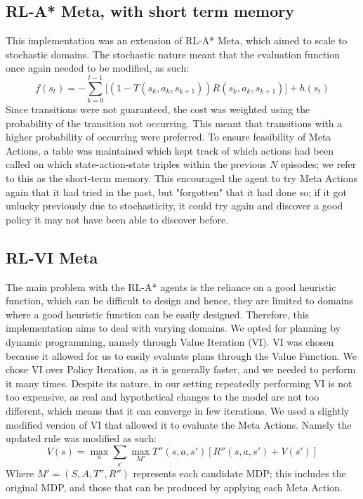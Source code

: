 \subsection{RL-A* Meta, with short term memory}
\label{sec:342}
This implementation was an extension of RL-A* Meta, which aimed to scale to stochastic domains. The stochastic nature meant that the evaluation function once again needed to be modified, as such:
\begin{equation}
\label{eqn:astarevalsast}
f(s_t) = -\sum_{k=0}^{t-1}\Bigg[(1-T(s_k, a_k, s_{k+1}))R(s_k, a_k, s_{k+1})\Bigg] + h(s_t)
\end{equation}
Since transitions were not guaranteed, the cost was weighted using the probability of the transition not occurring. This meant that transitions with a higher probability of occurring were preferred.
To ensure feasibility of Meta Actions, a table was maintained which kept track of which actions had been called on which state-action-state triples within the previous $N$ episodes; we refer to this as the short-term memory. This encouraged the agent to try Meta Actions again that it had tried in the past, but "forgotten" that it had done so; if it got unlucky previously due to stochasticity, it could try again and discover a good policy it may not have been able to discover before.
\subsection{RL-VI Meta}
The main problem with the RL-A* agents is the reliance on a good heuristic function, which can be difficult to design and hence, they are limited to domains where a good heuristic function can be easily designed.
Therefore, this implementation aims to deal with varying domains. We opted for planning by dynamic programming, namely through Value Iteration (VI). VI was chosen because it allowed for us to easily evaluate plans through the Value Function. We chose VI over Policy Iteration, as it is generally faster, and we needed to perform it many times. Despite its nature, in our setting repeatedly performing VI is not too expensive, as real and hypothetical changes to the model are not too different, which means that it can converge in few iterations. We used a slightly modified version of VI that allowed it to evaluate the Meta Actions. Namely the updated rule was modified as such:
\begin{equation}
\label{eqn:meta_vi}
    V(s) = \max_a \sum_{s'}\max_{M'}T''(s,a,s')[R''(s,a,s') + V(s')]
\end{equation}
Where $M'=(S,A,T'',R'')$ represents each candidate MDP; this includes the original MDP, and those that can be produced by applying each Meta Action.

